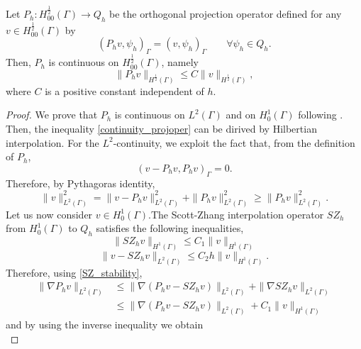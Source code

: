 \begin{lemma}
Let $P_h: H^{\frac 12}_{00}(\Gamma) \longrightarrow Q_h$ be the orthogonal projection operator defined  for any $v \in H^{\frac 12}_{00}(\Gamma)$ by
\begin{equation*}
(P_h v , \psi_h)_\Gamma= (v, \psi_h)_\Gamma \qquad \forall \psi_h \in Q_h.  
\end{equation*} 
Then, $P_h$ is continuous on $H^{\frac 12}_{00}(\Gamma)$, namely
\begin{equation}\label{continuity_projoper}
\|P_h v\|_{H^{\frac 12}(\Gamma)} \leq C \|v\|_{H^{\frac 12}(\Gamma)},
\end{equation}
where $C$ is a positive constant independent of $h$.
\end{lemma}
\begin{proof}
We prove that $P_h$ is continuous on $L^2(\Gamma)$ and on $H^1_0(\Gamma)$ following \cite[Section 1.6.3]{MR2050138}.  Then, the inequality \eqref{continuity_projoper} can be dirived by Hilbertian interpolation. For the $L^2$-continuity, we exploit the fact that, from the definition of $P_h$,
\begin{equation*}
(v-P_h v,P_h v)_{\Gamma}=0.
\end{equation*} 
Therefore, by Pythagoras identity,
\begin{equation*}
\|v\|^2_{L^2(\Gamma)} = \|v-P_h v\|_{L^2(\Gamma)}^2 + \|P_h v\|_{L^2(\Gamma)}^2 \geq \|P_h v\|^2 _{L^2(\Gamma)}.
\end{equation*}
Let us now consider $v\in H^1_0(\Gamma)$.The Scott-Zhang interpolation operator $SZ_h$ from $H^1_0(\Gamma)$ to $Q_h$ satisfies the following inequalities,
\begin{equation}\label{SZ_stability}
\|SZ_h v\|_{H^1(\Gamma)} \leq C_1 \|v\|_{H^1(\Gamma)}
\end{equation} 
\begin{equation}\label{SZ_approx}
\|v -SZ_h v \|_{L^2(\Gamma)}\leq C_2 h \|v\|_{H^1(\Gamma)}.
\end{equation}
Therefore, using \eqref{SZ_stability},
\begin{equation*}
\begin{split}
\|\nabla P_h v\|_{L^2(\Gamma)} 
&\leq \|\nabla (P_h v - SZ_h v)\|_{L^2(\Gamma)} + \|\nabla SZ_h v\|_{L^2(\Gamma)}\\
&\leq  \|\nabla (P_h v - SZ_h v)\|_{L^2(\Gamma)} + C_1\|v\|_{H^1(\Gamma)}
\end{split}
\end{equation*}
and by using the inverse inequality we obtain
\begin{equation*}

\end{equation*}
\end{proof}
